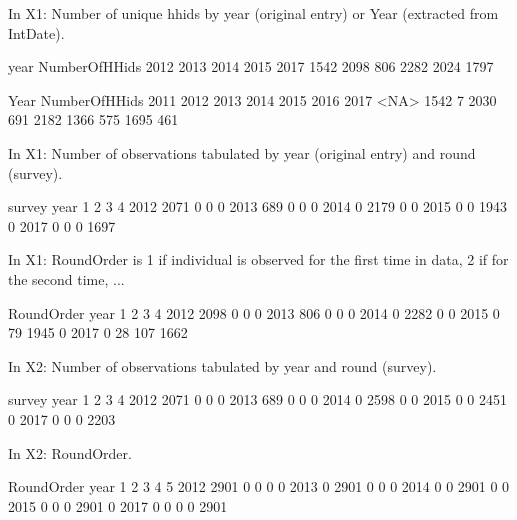 In \textsf{X1}: Number of unique \textsf{hhid}s by \textsf{year} (original entry) or \textsf{Year} (extracted from \textsf{IntDate}).
\begin{Schunk}
\begin{Soutput}
             year
NumberOfHHids 2012 2013 2014 2015 2017
         1542 2098  806 2282 2024 1797
\end{Soutput}
\begin{Soutput}
             Year
NumberOfHHids 2011 2012 2013 2014 2015 2016 2017 <NA>
         1542    7 2030  691 2182 1366  575 1695  461
\end{Soutput}
\end{Schunk}
In \textsf{X1}: Number of observations tabulated by \textsf{year} (original entry) and round (\textsf{survey}).
\begin{Schunk}
\begin{Soutput}
      survey
year      1    2    3    4
  2012 2071    0    0    0
  2013  689    0    0    0
  2014    0 2179    0    0
  2015    0    0 1943    0
  2017    0    0    0 1697
\end{Soutput}
\end{Schunk}
In \textsf{X1}: RoundOrder is 1 if individual is observed for the first time in data, 2 if for the second time, ...
\begin{Schunk}
\begin{Soutput}
      RoundOrder
year      1    2    3    4
  2012 2098    0    0    0
  2013  806    0    0    0
  2014    0 2282    0    0
  2015    0   79 1945    0
  2017    0   28  107 1662
\end{Soutput}
\end{Schunk}
In \textsf{X2}: Number of observations tabulated by year and round (\textsf{survey}).
\begin{Schunk}
\begin{Soutput}
      survey
year      1    2    3    4
  2012 2071    0    0    0
  2013  689    0    0    0
  2014    0 2598    0    0
  2015    0    0 2451    0
  2017    0    0    0 2203
\end{Soutput}
\end{Schunk}
In \textsf{X2}: RoundOrder.
\begin{Schunk}
\begin{Soutput}
      RoundOrder
year      1    2    3    4    5
  2012 2901    0    0    0    0
  2013    0 2901    0    0    0
  2014    0    0 2901    0    0
  2015    0    0    0 2901    0
  2017    0    0    0    0 2901
\end{Soutput}
\end{Schunk}

